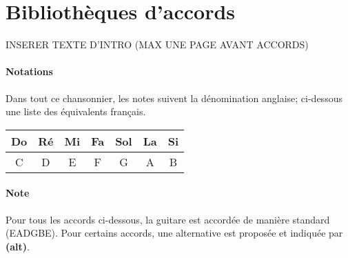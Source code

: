 
\section{Bibliothèques d'accords}
INSERER TEXTE D'INTRO (MAX UNE PAGE AVANT ACCORDS)
\paragraph{Notations} Dans tout ce chansonnier, les notes suivent la dénomination anglaise; ci-dessous une liste des équivalents français.
\newline\newline
\begin{tabular}{||c||c||c||c||c||c||c||}
    \hline
    Do & Ré & Mi & Fa & Sol & La & Si\\
    \hline
    C & D & E & F & G & A & B\\
    \hline
\end{tabular}
\paragraph{Note} Pour tous les accords ci-dessous, la guitare est accordée de manière standard (EADGBE).\newline
Pour certains accords, une alternative est proposée et indiquée par \textbf{(alt)}.

\newpage
\usebox{\A}
\usebox{\Aalt}
\usebox{\Am}
\usebox{\Amalt}
\usebox{\Afive}
\usebox{\Aseven}
\usebox{\Asevenalt}
\usebox{\Amajseven}
\usebox{\Amajsevenalt}
\usebox{\Amseven}
\usebox{\Amsevenalt}
\usebox{\Asusfour}
\usebox{\Asusfouralt}
\usebox{\Aaddnine}
\usebox{\Asustwo}
\usebox{\Asevensusfour}
\usebox{\Asevensusfouralt}
\usebox{\Asevensharpnine}
\usebox{\Anine}

\newpage
\usebox{\B}
\usebox{\Bm}
\usebox{\Bfive}
\usebox{\Bseven}
\usebox{\Bsevenalt}
\usebox{\Bmajseven}
\usebox{\Bmseven}
\usebox{\Bsusfour}
\usebox{\Baddnine}
\usebox{\Bsustwo}
\usebox{\Bsevensusfour}
\usebox{\Bsevensharpnine}
\usebox{\Bnine}

\newpage
\usebox{\C}
\usebox{\Calt}
\usebox{\Cm}
\usebox{\Cfive}
\usebox{\Cseven}
\usebox{\Csevenalt}
\usebox{\Cmajseven}
\usebox{\Cmajsevenalt}
\usebox{\Cmseven}
\usebox{\Csusfour}
\usebox{\Caddnine}
\usebox{\Caddninealt}
\usebox{\Csustwo}
\usebox{\Csevensusfour}
\usebox{\Csevensharpnine}
\usebox{\Cnine}

\newpage
\usebox{\D}
\usebox{\Dalt}
\usebox{\Dm}
\usebox{\Dmalt}
\usebox{\Dfive}
\usebox{\Dseven}
\usebox{\Dsevenalt}
\usebox{\Dmajseven}
\usebox{\Dmajsevenalt}
\usebox{\Dmseven}
\usebox{\Dmsevenalt}
\usebox{\Dsusfour}
\usebox{\Dsusfouralt}
\usebox{\Daddnine}
\usebox{\Dsustwo}
\usebox{\Dsustwoalt}
\usebox{\Dsevensusfour}
\usebox{\Dsevensusfouralt}
\usebox{\Dsevensharpnine}
\usebox{\Dnine}

